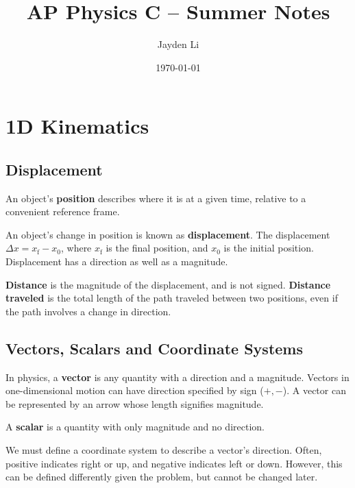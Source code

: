 \documentclass{article}
\title{\vspace*{-40pt}AP Physics C -- Summer Notes}
\author{Jayden Li}
\date{\today}
\newcommand{\definition}[1]{\begin{tcolorbox}[colback=red!5!white,colframe=red!75!black,parbox=false] #1 \end{tcolorbox}}
\begin{document}
\fontsize{11pt}{12pt}\selectfont
\setlength{\abovedisplayskip}{\abovedisplayskip/2}
\setlength{\belowdisplayskip}{\belowdisplayskip/2}
\setlength{\parindent}{0pt}
\setlength{\parskip}{2ex plus 0.5ex minus 0.2ex}
\maketitle

\tableofcontents
\newpage

\section{1D Kinematics}

\subsection{Displacement}

\definition{An object's \textbf{position} describes where it is at a given time, relative to a convenient reference frame.}

\definition{An object's change in position is known as \textbf{displacement}. The displacement $\Delta x=x_\text{f}-x_0$, where $x_\text{f}$ is the final position, and $x_0$ is the initial position. Displacement has a direction as well as a magnitude.}

\definition{\textbf{Distance} is the magnitude of the displacement, and is not signed. \textbf{Distance traveled} is the total length of the path traveled between two positions, even if the path involves a change in direction.}

\subsection{Vectors, Scalars and Coordinate Systems}

\definition{In physics, a \textbf{vector} is any quantity with a direction and a magnitude. Vectors in one-dimensional motion can have direction specified by sign ($+,-$). A vector can be represented by an arrow whose length signifies magnitude.}

\definition{A \textbf{scalar} is a quantity with only magnitude and no direction.}

We must define a coordinate system to describe a vector's direction. Often, positive indicates right or up, and negative indicates left or down. However, this can be defined differently given the problem, but cannot be changed later.
\end{document}
